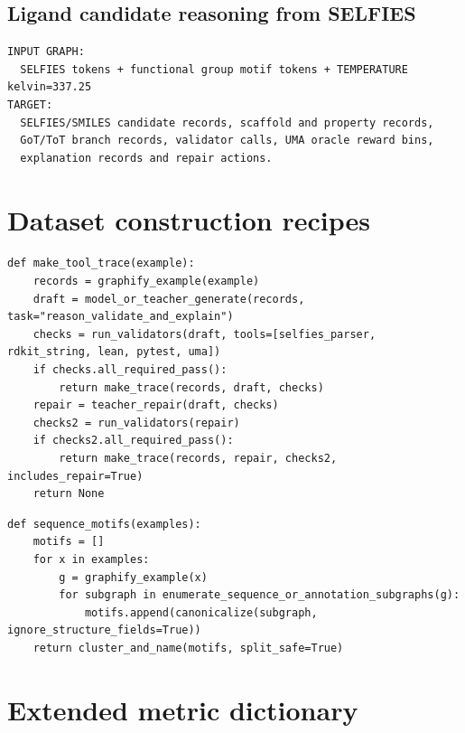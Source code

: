 \documentclass[11pt]{article}
\newcommand{\1}{\mathbf{1}}
\begin{document}
\subsection{Ligand candidate reasoning from SELFIES}
\begin{lstlisting}
INPUT GRAPH:
  SELFIES tokens + functional group motif tokens + TEMPERATURE kelvin=337.25
TARGET:
  SELFIES/SMILES candidate records, scaffold and property records,
  GoT/ToT branch records, validator calls, UMA oracle reward bins,
  explanation records and repair actions.
\end{lstlisting}

\section{Dataset construction recipes}

\begin{lstlisting}[caption={Synthetic verified tool-trace construction.}]
def make_tool_trace(example):
    records = graphify_example(example)
    draft = model_or_teacher_generate(records, task="reason_validate_and_explain")
    checks = run_validators(draft, tools=[selfies_parser, rdkit_string, lean, pytest, uma])
    if checks.all_required_pass():
        return make_trace(records, draft, checks)
    repair = teacher_repair(draft, checks)
    checks2 = run_validators(repair)
    if checks2.all_required_pass():
        return make_trace(records, repair, checks2, includes_repair=True)
    return None
\end{lstlisting}

\begin{lstlisting}[caption={Sequence-first motif construction.}]
def sequence_motifs(examples):
    motifs = []
    for x in examples:
        g = graphify_example(x)
        for subgraph in enumerate_sequence_or_annotation_subgraphs(g):
            motifs.append(canonicalize(subgraph, ignore_structure_fields=True))
    return cluster_and_name(motifs, split_safe=True)
\end{lstlisting}

\section{Extended metric dictionary}
\end{document}
